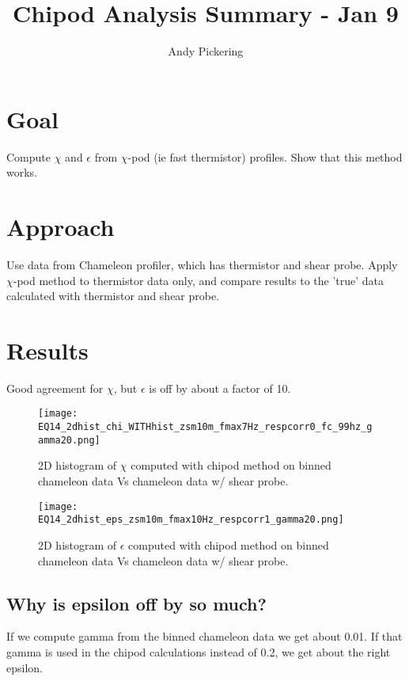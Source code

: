 \documentclass[11pt]{article}
\title{Chipod Analysis Summary - Jan 9}
\author{Andy Pickering}
\begin{document}
\maketitle

\tableofcontents
\newpage

\section{Goal}

Compute $\chi$ and $\epsilon$ from $\chi$-pod (ie fast thermistor) profiles. Show that this method works.

\section{Approach}
Use data from Chameleon profiler, which has thermistor and shear probe. Apply $\chi$-pod method to thermistor data only, and compare results to the 'true' data calculated with thermistor and shear probe. 

\section{Results}
Good agreement for $\chi$, but $\epsilon$ is off by about a factor of 10.

\begin{figure}[htbp]
\texttt{[image: EQ14\_2dhist\_chi\_WITHhist\_zsm10m\_fmax7Hz\_respcorr0\_fc\_99hz\_gamma20.png]}
\caption{2D histogram of $\chi$ computed with chipod method on binned chameleon data Vs chameleon data w/ shear probe.}
\label{}
\end{figure}

\begin{figure}[htbp]
\texttt{[image: EQ14\_2dhist\_eps\_zsm10m\_fmax10Hz\_respcorr1\_gamma20.png]}
\caption{2D histogram of $\epsilon$ computed with chipod method on binned chameleon data Vs chameleon data w/ shear probe.}
\label{}
\end{figure}


\subsection{Why is epsilon off by so much?}
If we compute gamma from the binned chameleon data we get about 0.01. If that gamma is used in the chipod calculations instead of 0.2, we get about the right epsilon.
\end{document}

